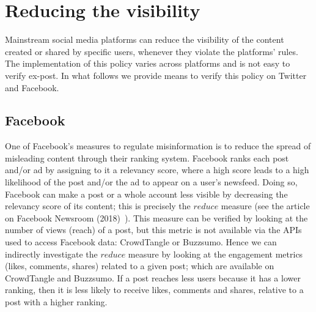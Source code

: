 \documentclass{article}
\begin{document}

%





\section{Reducing the visibility}

Mainstream social media platforms can reduce the visibility of the content created or shared by specific users, whenever they violate the platforms' rules. The implementation of this policy varies across platforms and is not easy to verify ex-post. In what follows we provide means to verify this policy on Twitter and Facebook. 
 

\subsection{Facebook}


One of Facebook’s measures to regulate misinformation is to reduce the spread of misleading content through their ranking system. Facebook ranks each post and/or ad by assigning to it a relevancy score, where a high score leads to a high likelihood of the post and/or the ad to appear on a user's newsfeed. Doing so, Facebook can make a post or a whole account less visible by decreasing the relevancy score of its content; this is precisely the $reduce$ measure (see the article on Facebook Newsroom (2018)~\cite{newsroom2}). This measure can be verified by looking at the number of views (reach) of a post, but this metric is not available via the APIs used to access Facebook data: CrowdTangle or Buzzsumo. Hence we can indirectly investigate the $reduce$ measure by looking at the engagement metrics (likes, comments, shares) related to a given post; which are available on CrowdTangle and Buzzsumo. If a post reaches less users because it has a lower ranking, then it is less likely to receive likes, comments and shares, relative to a post with a higher ranking. 

\end{document}
